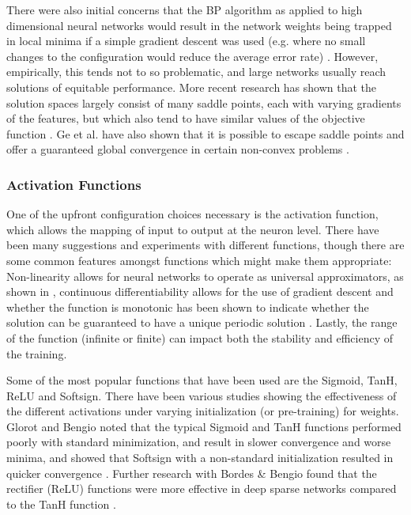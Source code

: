 \documentclass[a4paper,11pt,oneside]{article}
\theoremstyle{plain}
\theoremstyle{definition}
\begin{document}
There were also initial concerns that the BP algorithm as applied to high dimensional neural networks would result 
in the network weights being trapped in local minima if a simple gradient descent was used (e.g. where no small 
changes to the configuration would reduce the average error rate) \cite{LeCun4}. 
However, empirically, this tends not to so problematic, and large networks usually reach solutions of equitable 
performance. More recent research has shown that the solution spaces largely consist of many saddle points, each 
with varying gradients of the features, but which also tend to have similar values of the objective function \cite{Dauphin}. 
Ge et al. have also shown that it is possible to escape saddle points and offer a guaranteed global convergence 
in certain non-convex problems \cite{Ge}.
\hfill \break 

\subsubsection{Activation Functions}\label{lr_activationfunctions}

One of the upfront configuration choices necessary is the activation function, which allows the mapping of input 
to output at the neuron level. There have been many suggestions and experiments with different functions, though 
there are some common features amongst functions which might make them appropriate: Non-linearity allows for 
neural networks to operate as universal approximators, as shown in \cite{Hornik}, continuous differentiability allows for the 
use of gradient descent and whether the function is monotonic has been shown to indicate whether the solution 
can be guaranteed to have a unique periodic solution \cite{Wu}. Lastly, the range of the function (infinite or finite) can impact both the 
stability and efficiency of the training.
\hfill \break 

Some of the most popular functions that have been used are the Sigmoid, TanH, ReLU and Softsign. There have 
been various studies showing the effectiveness of the different activations under varying initialization (or pre-training) 
for weights. Glorot and Bengio noted that the typical Sigmoid and TanH functions performed poorly with standard 
minimization, and result in slower convergence and worse minima, and showed that Softsign with a non-standard 
initialization resulted in quicker convergence \cite{Glorot}. Further research with Bordes \& Bengio found that the 
rectifier (ReLU) functions were  more effective in deep sparse networks compared to the TanH function \cite{Glorot2}.
\end{document}
